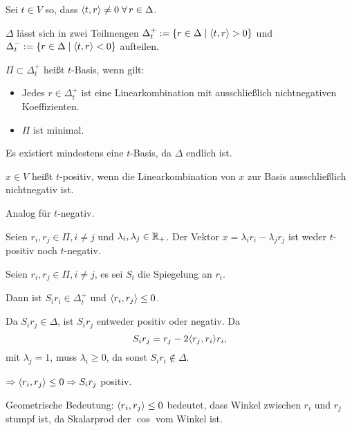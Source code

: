 \documentclass{article}
\begin{document}
\begin{defi}
    Sei \( t \in V \) so, dass \( \scalarprod{t}{r} \neq 0 
    \; \forall r \in \Delta \).

    \( \Delta \) lässt sich in zwei Teilmengen 
    \( \Delta_t^+ := 
    \{r \in \Delta \;\vert \; \langle t, r \rangle > 0\} \) 
    und \( \Delta_t^- := 
    \{r \in \Delta \;\vert \; \langle t, r \rangle < 0\} \) 
    aufteilen. 
\end{defi}

\begin{defi}[\( t \)-Basis]
    \( \Pi \subset \Delta_t^+ \) heißt \( t \)-Basis, 
    wenn gilt:
    \begin{itemize}
        \item Jedes \( r \in \Delta_t^+ \) ist 
        eine Linearkombination mit ausschließlich 
        nichtnegativen Koeffizienten.
        \item \( \Pi \) ist minimal.
    \end{itemize}
    Es existiert mindestens eine \( t \)-Basis, 
    da \( \Delta \) endlich ist.
\end{defi}

\begin{defi}[\( t \)-positiv]
    \( x \in V \) heißt \(t\)-positiv, wenn 
    die Linearkombination von \(x\) zur 
    Basis ausschließlich nichtnegativ ist.

    Analog für \( t \)-negativ.
\end{defi}

\begin{satz} %
    Seien \( r_i, r_j \in \Pi, i \neq j \) und 
    \( \lambda_i, \lambda_j \in \mathbb{R}_+ \). 
    Der Vektor \( x = \lambda_i r_i - \lambda_j r_j \) 
    ist weder \( t \)-positiv noch \( t \)-negativ.
\end{satz}

\begin{satz} %
    Seien \( r_i, r_j \in \Pi, i \neq j \), es 
    sei \( S_i \) die Spiegelung an \( r_i \). 

    Dann ist \( S_i r_i \in \Delta_t^+ \) und 
    \( \langle r_i, r_j \rangle \leq 0 \).
\end{satz}
\begin{bew}
    Da \( S_i r_j \in \Delta \), ist \( S_i r_j \) 
    entweder positiv oder negativ. Da 
    \[ S_i r_j = r_j - 2 \langle r_j, r_i \rangle r_i, \]
    mit \( \lambda_j = 1 \), muss 
    \( \lambda_i \geq 0 \), da sonst 
    \( S_i r_i \notin \Delta \). 

    \( \Rightarrow \langle r_i, r_j \rangle \leq 0 
    \Rightarrow S_i r_j \) 
    positiv.
\end{bew}
\begin{bem}
    Geometrische Bedeutung:
    \( \langle r_i, r_j \rangle \leq 0 \) bedeutet, 
    dass Winkel zwischen \(r_i\) und \(r_j\) 
    stumpf ist, da Skalarprod der \(\cos \) 
    vom Winkel ist.
\end{bem}
\end{document}
